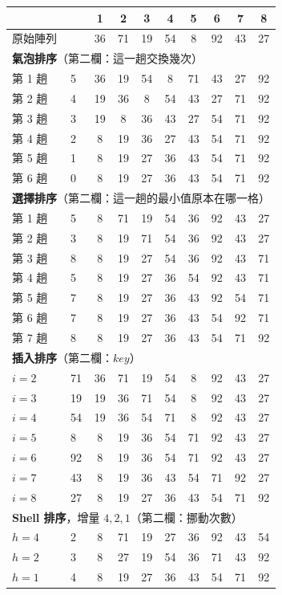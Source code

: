\begin{center}
\footnotesize
\begin{tabular}{ll*{8}{c}}
\toprule
& & 1 & 2 & 3 & 4 & 5 & 6 & 7 & 8 \\
\midrule
原始陣列 & & 36 & 71 & 19 & 54 & 8 & 92 & 43 & 27 \\
\midrule
\multicolumn{10}{l}{\textbf{氣泡排序}（第二欄：這一趟交換幾次）} \\
第 1 趟 & 5 & 36 & 19 & 54 & 8 & 71 & 43 & 27 & 92 \\
第 2 趟 & 4 & 19 & 36 & 8 & 54 & 43 & 27 & 71 & 92 \\
第 3 趟 & 3 & 19 & 8 & 36 & 43 & 27 & 54 & 71 & 92 \\
第 4 趟 & 2 & 8 & 19 & 36 & 27 & 43 & 54 & 71 & 92 \\
第 5 趟 & 1 & 8 & 19 & 27 & 36 & 43 & 54 & 71 & 92 \\
第 6 趟 & 0 & 8 & 19 & 27 & 36 & 43 & 54 & 71 & 92 \\
\midrule
\multicolumn{10}{l}{\textbf{選擇排序}（第二欄：這一趟的最小值原本在哪一格）} \\
第 1 趟 & 5 & 8 & 71 & 19 & 54 & 36 & 92 & 43 & 27 \\
第 2 趟 & 3 & 8 & 19 & 71 & 54 & 36 & 92 & 43 & 27 \\
第 3 趟 & 8 & 8 & 19 & 27 & 54 & 36 & 92 & 43 & 71 \\
第 4 趟 & 5 & 8 & 19 & 27 & 36 & 54 & 92 & 43 & 71 \\
第 5 趟 & 7 & 8 & 19 & 27 & 36 & 43 & 92 & 54 & 71 \\
第 6 趟 & 7 & 8 & 19 & 27 & 36 & 43 & 54 & 92 & 71 \\
第 7 趟 & 8 & 8 & 19 & 27 & 36 & 43 & 54 & 71 & 92 \\
\midrule
\multicolumn{10}{l}{\textbf{插入排序}（第二欄：$\mathit{key}$）} \\
$i = 2$ & 71 & 36 & 71 & 19 & 54 & 8 & 92 & 43 & 27 \\
$i = 3$ & 19 & 19 & 36 & 71 & 54 & 8 & 92 & 43 & 27 \\
$i = 4$ & 54 & 19 & 36 & 54 & 71 & 8 & 92 & 43 & 27 \\
$i = 5$ & 8 & 8 & 19 & 36 & 54 & 71 & 92 & 43 & 27 \\
$i = 6$ & 92 & 8 & 19 & 36 & 54 & 71 & 92 & 43 & 27 \\
$i = 7$ & 43 & 8 & 19 & 36 & 43 & 54 & 71 & 92 & 27 \\
$i = 8$ & 27 & 8 & 19 & 27 & 36 & 43 & 54 & 71 & 92 \\
\midrule
\multicolumn{10}{l}{\textbf{Shell 排序}，增量 $4, 2, 1$（第二欄：挪動次數）} \\
$h = 4$ & 2 & 8 & 71 & 19 & 27 & 36 & 92 & 43 & 54 \\
$h = 2$ & 3 & 8 & 27 & 19 & 54 & 36 & 71 & 43 & 92 \\
$h = 1$ & 4 & 8 & 19 & 27 & 36 & 43 & 54 & 71 & 92 \\
\bottomrule
\end{tabular}
\end{center}

